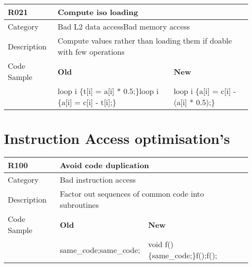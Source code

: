 \begin{tabular}{|p{0.9in}|p{2.0in}|p{2.0in}|} \hline
\textbf{R021}       & \multicolumn{2}{|p{4.0in}|}{\textbf{Compute iso loading}} \\ \hline
Category            & \multicolumn{2}{|p{4.0in}|}{Bad L2 data access\newline Bad memory access} \\ \hline
Description         & \multicolumn{2}{|p{4.0in}|}{Compute values rather than loading them if doable with few operations} \\ \hline
Code Sample         & \textbf{Old} & \textbf{New} \\ \hline
                    & loop i \{\newline   t[i] = a[i] * 0.5;\newline \}\newline loop i \{\newline   a[i] = c[i] - t[i];\newline \}
                    & loop i \{\newline   a[i] = c[i] - (a[i] * 0.5);\newline \} \\ \hline
\end{tabular}

\section{Instruction Access optimisation's}
\label{sec:Instruction_Access_Optimizations}

\begin{tabular}{|p{0.9in}|p{2.0in}|p{2.0in}|} \hline
\textbf{R100}       & \multicolumn{2}{|p{4.0in}|}{\textbf{Avoid code duplication}} \\ \hline
Category            & \multicolumn{2}{|p{4.0in}|}{Bad instruction access} \\ \hline
Description         & \multicolumn{2}{|p{4.0in}|}{Factor out sequences of common code into subroutines} \\ \hline
Code Sample         & \textbf{Old} & \textbf{New} \\ \hline
                    & same\_code;\newline same\_code;
                    & void f() \{same\_code;\}\newline f();\newline f(); \\ \hline
\end{tabular}

